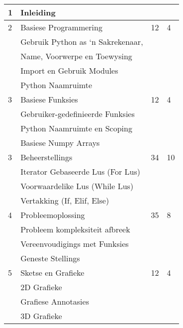 \begin{longtable}{|p{2.0cm}|p{7.6cm}|p{2.0cm}|p{1.8cm}|}
             1  & Inleiding                                    &    &    \\
             \hline
             2  & Basiese Programmering                        & 12 & 4  \\
                & \qquad Gebruik Python as `n Sakrekenaar,     &    &    \\
                & \qquad Name, Voorwerpe en Toewysing          &    &    \\
                & \qquad Import en Gebruik Modules             &    &    \\
                & \qquad Python Naamruimte                     &    &    \\
             \hline
             3  & Basiese Funksies                             & 12 & 4  \\
                & \qquad Gebruiker-gedefinieerde Funksies      &    &    \\
                & \qquad Python Naamruimte en Scoping          &    &    \\
                & \qquad Basiese Numpy Arrays                  &    &    \\
             \hline
             3  & Beheerstellings                              & 34 & 10 \\
                & \qquad Iterator Gebaseerde Lus (For Lus)     &    &    \\
                & \qquad Voorwaardelike Lus (While Lus)        &    &    \\
                & \qquad Vertakking (If, Elif, Else)           &    &    \\
             \hline
             4  & Probleemoplossing                            & 35 & 8  \\
                & \qquad Probleem kompleksiteit afbreek        &    &    \\
                & \qquad Vereenvoudigings met Funksies         &    &    \\
                & \qquad Geneste Stellings                     &    &    \\
             \hline
             5  & Sketse en Grafieke                           & 12 & 4  \\
                & \qquad 2D Grafieke                           &    &    \\
                & \qquad Grafiese Annotasies                   &    &    \\
                & \qquad 3D Grafieke                           &    &    \\

\end{longtable}
